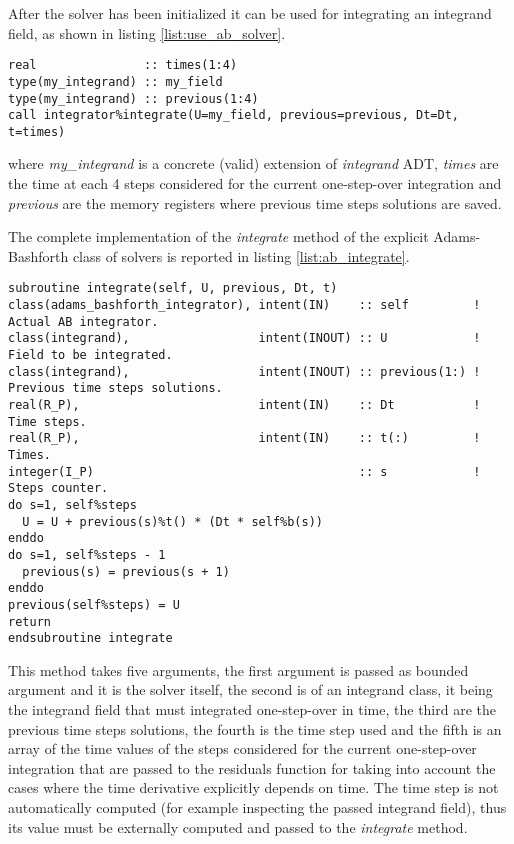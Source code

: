 \documentclass[pdftex,preprint,3p,times,numbers]{elsarticle}
\begin{document}
After the solver has been initialized it can be used for integrating an integrand field, as shown in listing \ref{list:use_ab_solver}.

\begin{lstlisting}[firstnumber=1,style=code,caption={example of usage of an Adams-Bashforth integrator},label={list:use_ab_solver}]
real               :: times(1:4)
type(my_integrand) :: my_field
type(my_integrand) :: previous(1:4)
call integrator%integrate(U=my_field, previous=previous, Dt=Dt, t=times)
\end{lstlisting}
where \emph{my\_integrand} is a concrete (valid) extension of \emph{integrand} ADT, \emph{times} are the time at each 4 steps considered for the current one-step-over integration and \emph{previous} are the memory registers where previous time steps solutions are saved.

The complete implementation of the \emph{integrate} method of the explicit Adams-Bashforth class of solvers is reported in listing \ref{list:ab_integrate}.

\begin{lstlisting}[firstnumber=1,style=code,caption={implementation of the \emph{integrate} method of explicit Adams-Bashforth class},label={list:ab_integrate}]
subroutine integrate(self, U, previous, Dt, t)
class(adams_bashforth_integrator), intent(IN)    :: self         ! Actual AB integrator.
class(integrand),                  intent(INOUT) :: U            ! Field to be integrated.
class(integrand),                  intent(INOUT) :: previous(1:) ! Previous time steps solutions.
real(R_P),                         intent(IN)    :: Dt           ! Time steps.
real(R_P),                         intent(IN)    :: t(:)         ! Times.
integer(I_P)                                     :: s            ! Steps counter.
do s=1, self%steps
  U = U + previous(s)%t() * (Dt * self%b(s))
enddo
do s=1, self%steps - 1
  previous(s) = previous(s + 1)
enddo
previous(self%steps) = U
return
endsubroutine integrate
\end{lstlisting}

This method takes five arguments, the first argument is passed as bounded argument and it is the solver itself, the second is of an integrand class, it being the integrand field that must integrated one-step-over in time, the third are the previous time steps solutions, the fourth is the time step used and the fifth is an array of the time values of the steps considered for the current one-step-over integration that are passed to the residuals function for taking into account the cases where the time derivative explicitly depends on time. The time step is not automatically computed (for example inspecting the passed integrand field), thus its value must be externally computed and passed to the \emph{integrate} method.
\end{document}
